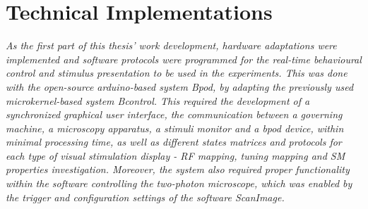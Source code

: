 
\chapter{Technical Implementations}
\label{cap:TechnicalImplementations}

\textit{As the first part of this thesis' work development, hardware adaptations were implemented and software protocols were programmed for the real-time behavioural control and stimulus presentation to be used in the experiments. This was done with the open-source arduino-based system Bpod, by adapting the previously used microkernel-based system Bcontrol. This required the development of a synchronized graphical user interface, the communication between a governing machine, a microscopy apparatus, a stimuli monitor and a bpod device, within minimal processing time, as well as different states matrices and protocols for each type of visual stimulation display - RF mapping, tuning mapping and SM properties investigation.
Moreover, the system also required proper functionality within the software controlling the two-photon microscope, which was enabled by the trigger and configuration settings of the software ScanImage.}




%
%
%
